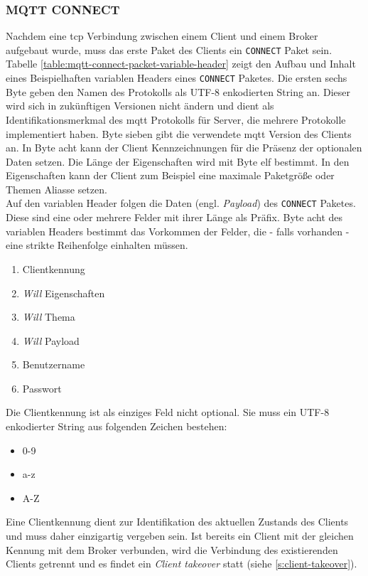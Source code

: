 \subsubsection{MQTT CONNECT} \label{s:mqtt-connect}
Nachdem eine \ac{tcp} Verbindung zwischen einem Client und einem Broker aufgebaut wurde, muss das erste Paket des Clients ein \verb|CONNECT| Paket sein.
Tabelle \ref{table:mqtt-connect-packet-variable-header} zeigt den Aufbau und Inhalt eines Beispielhaften variablen Headers eines \verb|CONNECT| Paketes.
Die ersten sechs Byte geben den Namen des Protokolls als UTF-8 enkodierten String an. Dieser wird sich in zukünftigen Versionen nicht ändern und dient als Identifikationsmerkmal des \ac{mqtt} Protokolls für Server, die mehrere Protokolle implementiert haben. Byte sieben gibt die verwendete \ac{mqtt} Version des Clients an. In Byte acht kann der Client Kennzeichnungen für die Präsenz der optionalen Daten setzen. Die Länge der Eigenschaften wird mit Byte elf bestimmt. In den Eigenschaften kann der Client zum Beispiel eine maximale Paketgrö{\ss}e oder Themen Aliasse setzen.\cite{mqtt5Specification}\\
Auf den variablen Header folgen die Daten (engl. \textit{Payload}) des \verb|CONNECT| Paketes. Diese sind eine oder mehrere Felder mit ihrer Länge als Präfix. Byte acht des variablen Headers bestimmt das Vorkommen der Felder, die - falls vorhanden - eine strikte Reihenfolge einhalten müssen.
\cite{mqtt5Specification}
\begin{enumerate}
    \item Clientkennung
    \item \textit{Will} Eigenschaften
    \item \textit{Will} Thema
    \item \textit{Will} Payload
    \item Benutzername
    \item Passwort
\end{enumerate}
Die Clientkennung ist als einziges Feld nicht optional. Sie muss ein UTF-8 enkodierter String aus folgenden Zeichen bestehen:
\begin{itemize}
    \item 0-9
    \item a-z
    \item A-Z
\end{itemize}
Eine Clientkennung dient zur Identifikation des aktuellen Zustands des Clients und muss daher einzigartig vergeben sein. Ist bereits ein Client mit der gleichen Kennung mit dem Broker verbunden, wird die Verbindung des existierenden Clients getrennt und es findet ein \textit{Client takeover} statt (siehe \ref{s:client-takeover}).\cite{mqtt5Specification}
